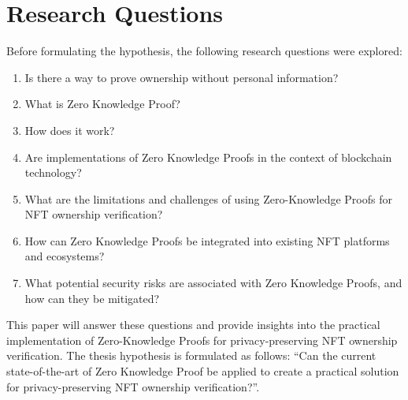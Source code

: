 \section{Research Questions}
Before formulating the hypothesis, the following research questions were explored:

\begin{enumerate}
\item Is there a way to prove ownership without personal information?
\item What is Zero Knowledge Proof?
\item How does it work?
\item Are implementations of Zero Knowledge Proofs in the context of blockchain technology?
\item What are the limitations and challenges of using Zero-Knowledge Proofs for \ac{NFT} ownership verification?
\item How can Zero Knowledge Proofs be integrated into existing \ac{NFT} platforms and ecosystems?
\item What potential security risks are associated with Zero Knowledge Proofs, and how can they be mitigated?
\end{enumerate}

This paper will answer these questions and provide insights into the practical implementation of Zero-Knowledge Proofs for privacy-preserving \ac{NFT} ownership verification. The thesis hypothesis is formulated as follows: ``Can the current state-of-the-art of Zero Knowledge Proof be applied to create a practical solution for privacy-preserving \ac{NFT} ownership verification?''.